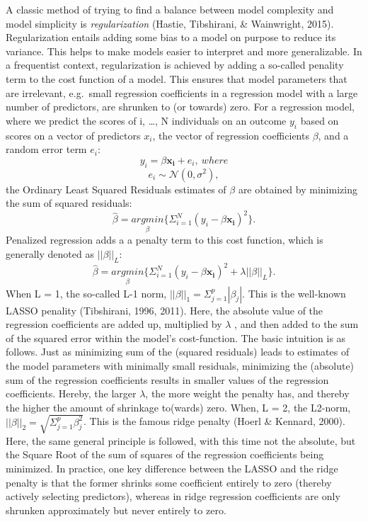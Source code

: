 \documentclass[
  man, donotrepeattitle,floatsintext]{apa6}
\begin{document}
A classic method of trying to find a balance between model complexity and model simplicity is \emph{regularization} (Hastie, Tibshirani, \& Wainwright, 2015). Regularization entails adding some bias to a model on purpose to reduce its variance. This helps to make models easier to interpret and more generalizable. In a frequentist context, regularization is achieved by adding a so-called penality term to the cost function of a model. This ensures that model parameters that are irrelevant, e.g.~small regression coefficients in a regression model with a large number of predictors, are shrunken to (or towards) zero. For a regression model, where we predict the scores of i, \ldots, N individuals on an outcome \(y_i\) based on scores on a vector of predictors \(x_i\), the vector of regression coefficients \(\beta\), and a random error term \(e_i\):
\[y_i = \beta \mathbf{x_i} + e_i, \ where \]
\[e_i \sim \mathcal{N}(0, \sigma^2), \]
the Ordinary Least Squared Residuals estimates of \(\beta\) are obtained by minimizing the sum of squared residuals:
\[ \hat{\beta} = \underset{\beta}{argmin} \{ \Sigma_{i=1}^N(y_i - \beta\mathbf{x_{i}} )^2 \}.\] Penalized regression adds a a penalty term to this cost function, which is generally denoted as \(||\beta||_L\):
\[ \hat{\beta} = \underset{\beta}{argmin} \{ \Sigma_{i=1}^N(y_i - \beta \mathbf{x_{i}} )^2 + \lambda ||\beta||_{L} \}.\]
When L = 1, the so-called L-1 norm, \(||\beta||_1 = \Sigma_{j=1}^p |\beta_j|\). This is the well-known LASSO penality (Tibshirani, 1996, 2011). Here, the absolute value of the regression coefficients are added up, multiplied by \(\lambda\) , and then added to the sum of the squared error within the model's cost-function. The basic intuition is as follows. Just as minimizing sum of the (squared residuals) leads to estimates of the model parameters with minimally small residuals, minimizing the (absolute) sum of the regression coefficients results in smaller values of the regression coefficients. Hereby, the larger \(\lambda\), the more weight the penalty has, and thereby the higher the amount of shrinkage to(wards) zero. When, L = 2, the L2-norm, \(||\beta||_2 = \sqrt{\Sigma_{j=1}^p \beta_j^2}\). This is the famous ridge penalty (Hoerl \& Kennard, 2000). Here, the same general principle is followed, with this time not the absolute, but the Square Root of the sum of squares of the regression coefficients being minimized. In practice, one key difference between the LASSO and the ridge penalty is that the former shrinks some coefficient entirely to zero (thereby actively selecting predictors), whereas in ridge regression coefficients are only shrunken approximately but never entirely to zero.
\end{document}
